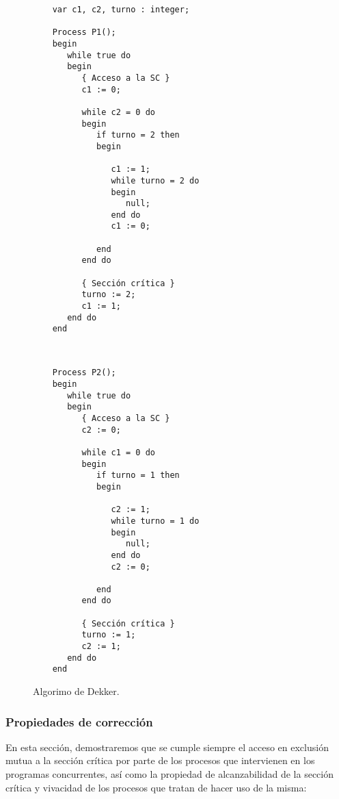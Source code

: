 \begin{figure}[H]
\setlength{\columnsep}{1cm}
\begin{multicols}{2}
    \begin{verbatim}
    var c1, c2, turno : integer;

    Process P1();
    begin
       while true do
       begin
          { Acceso a la SC }
          c1 := 0;

          while c2 = 0 do
          begin
             if turno = 2 then
             begin

                c1 := 1;
                while turno = 2 do
                begin
                   null;
                end do
                c1 := 0;

             end
          end do

          { Sección crítica }
          turno := 2;
          c1 := 1;
       end do
    end
\end{verbatim}
\begin{verbatim}


    Process P2();
    begin
       while true do
       begin
          { Acceso a la SC }
          c2 := 0;

          while c1 = 0 do
          begin
             if turno = 1 then
             begin

                c2 := 1;
                while turno = 1 do
                begin
                   null;
                end do
                c2 := 0;

             end
          end do

          { Sección crítica }
          turno := 1;
          c2 := 1;
       end do
    end
\end{verbatim}
\end{multicols}
\caption{Algorimo de Dekker.}
\label{fig:cod_dekker}
\end{figure}

\subsubsection{Propiedades de corrección}
En esta sección, demostraremos que se cumple siempre el acceso en exclusión mutua a la sección crítica por parte de los procesos que intervienen en los programas concurrentes, así como la propiedad de alcanzabilidad de la sección crítica y vivacidad de los procesos que tratan de hacer uso de la misma:

